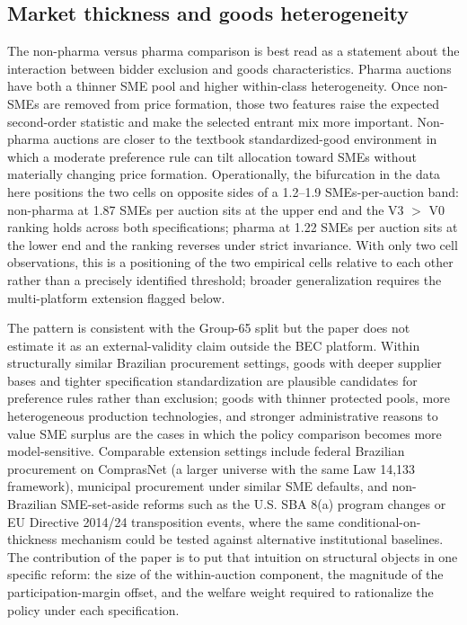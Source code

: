 \subsection{Market thickness and goods heterogeneity}

The non-pharma versus pharma comparison is best read as a statement about the interaction between bidder exclusion and goods characteristics. Pharma auctions have both a thinner SME pool and higher within-class heterogeneity. Once non-SMEs are removed from price formation, those two features raise the expected second-order statistic and make the selected entrant mix more important. Non-pharma auctions are closer to the textbook standardized-good environment in which a moderate preference rule can tilt allocation toward SMEs without materially changing price formation. Operationally, the bifurcation in the data here positions the two cells on opposite sides of a 1.2--1.9 SMEs-per-auction band: non-pharma at 1.87 SMEs per auction sits at the upper end and the V3 $>$ V0 ranking holds across both specifications; pharma at 1.22 SMEs per auction sits at the lower end and the ranking reverses under strict invariance. With only two cell observations, this is a positioning of the two empirical cells relative to each other rather than a precisely identified threshold; broader generalization requires the multi-platform extension flagged below.

The pattern is consistent with the Group-65 split but the paper does not estimate it as an external-validity claim outside the BEC platform. Within structurally similar Brazilian procurement settings, goods with deeper supplier bases and tighter specification standardization are plausible candidates for preference rules rather than exclusion; goods with thinner protected pools, more heterogeneous production technologies, and stronger administrative reasons to value SME surplus are the cases in which the policy comparison becomes more model-sensitive. Comparable extension settings include federal Brazilian procurement on ComprasNet (a larger universe with the same Law 14{,}133 framework), municipal procurement under similar SME defaults, and non-Brazilian SME-set-aside reforms such as the U.S. SBA 8(a) program changes or EU Directive 2014/24 transposition events, where the same conditional-on-thickness mechanism could be tested against alternative institutional baselines. The contribution of the paper is to put that intuition on structural objects in one specific reform: the size of the within-auction component, the magnitude of the participation-margin offset, and the welfare weight required to rationalize the policy under each specification.

